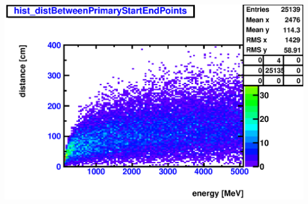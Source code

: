 \documentclass{beamer}
\begin{document}
\begin{frame}
\begin{columns}[t]
		\includegraphics[width=1.0\textwidth]{nue_C12_distBetweenPrimaryStartEndPoints_onlyCC_maxR600cm.eps}
	\end{columns}
\end{frame}
\end{document}
